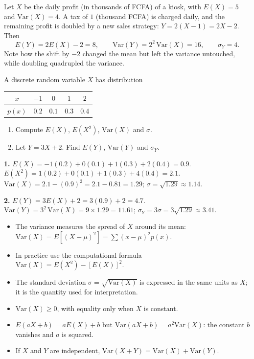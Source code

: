 \documentclass[11pt]{article}
\begin{document}
\begin{exemplebox}
Let $X$ be the daily profit (in thousands of FCFA) of a kiosk, with $E(X) = 5$ and $\mathrm{Var}(X) = 4$. A tax of $1$ (thousand FCFA) is charged daily, and the remaining profit is doubled by a new sales strategy: $Y = 2(X - 1) = 2X - 2$. Then
\[ E(Y) = 2E(X) - 2 = 8, \qquad \mathrm{Var}(Y) = 2^2\,\mathrm{Var}(X) = 16, \qquad \sigma_Y = 4. \]
Note how the shift by $-2$ changed the mean but left the variance untouched, while doubling quadrupled the variance.
\end{exemplebox}

\begin{exercice}[Practice]
A discrete random variable $X$ has distribution
\begin{center}
\begin{tabular}{|c|cccc|}
\hline
$x$ & $-1$ & $0$ & $1$ & $2$ \\ \hline
$p(x)$ & $0.2$ & $0.1$ & $0.3$ & $0.4$ \\ \hline
\end{tabular}
\end{center}
\begin{enumerate}
\item Compute $E(X)$, $E(X^2)$, $\mathrm{Var}(X)$ and $\sigma$.
\item Let $Y = 3X + 2$. Find $E(Y)$, $\mathrm{Var}(Y)$ and $\sigma_Y$.
\end{enumerate}
\end{exercice}

\begin{corrige}[Exercise 1]
\textbf{1.} $E(X) = -1(0.2) + 0(0.1) + 1(0.3) + 2(0.4) = 0.9$.
$E(X^2) = 1(0.2) + 0(0.1) + 1(0.3) + 4(0.4) = 2.1$.
$\mathrm{Var}(X) = 2.1 - (0.9)^2 = 2.1 - 0.81 = 1.29$; $\sigma = \sqrt{1.29} \approx 1.14$.

\textbf{2.} $E(Y) = 3E(X) + 2 = 3(0.9) + 2 = 4.7$.
$\mathrm{Var}(Y) = 3^2\,\mathrm{Var}(X) = 9 \times 1.29 = 11.61$; $\sigma_Y = 3\sigma = 3\sqrt{1.29} \approx 3.41$.
\end{corrige}

\begin{aretenir}
\begin{itemize}
\item The variance measures the spread of $X$ around its mean: $\mathrm{Var}(X) = E[(X-\mu)^2] = \sum (x-\mu)^2 p(x)$.
\item In practice use the computational formula $\mathrm{Var}(X) = E(X^2) - [E(X)]^2$.
\item The standard deviation $\sigma = \sqrt{\mathrm{Var}(X)}$ is expressed in the same units as $X$; it is the quantity used for interpretation.
\item $\mathrm{Var}(X) \ge 0$, with equality only when $X$ is constant.
\item $E(aX+b) = aE(X) + b$ but $\mathrm{Var}(aX+b) = a^2\mathrm{Var}(X)$: the constant $b$ vanishes and $a$ is squared.
\item If $X$ and $Y$ are independent, $\mathrm{Var}(X+Y) = \mathrm{Var}(X) + \mathrm{Var}(Y)$.
\end{itemize}
\end{aretenir}
\end{document}

